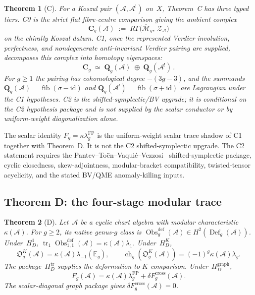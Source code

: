\documentclass[11pt,reqno]{amsart}
\newtheorem{theorem}{Theorem}[section]
\theoremstyle{definition}
\theoremstyle{remark}
\newcommand{\cA}{\mathcal{A}}
\newcommand{\cM}{\mathcal{M}}
\numberwithin{equation}{section}
\begin{document}
\begin{theorem}[C]\label{thm:C}
For a Koszul pair $(\cA, \cA^!)$ on~$X$, Theorem~C has three typed
tiers.  \textsc{C0} is the strict flat fibre-centre comparison giving
the ambient complex
\[
\mathbf{C}_g(\cA)
\;:=\;
R\Gamma\bigl(\overline{\cM}_g,\, \mathcal{Z}_\cA\bigr)
\]
on the chirally Koszul datum.  \textsc{C1}, once the represented
Verdier involution, perfectness, and nondegenerate anti-invariant
Verdier pairing are supplied, decomposes this complex into homotopy
eigenspaces:
\begin{equation}\label{eq:complementarity}
\mathbf{C}_g
\;\simeq\;
\mathbf{Q}_g(\cA) \;\oplus\; \mathbf{Q}_g(\cA^!)\,.
\end{equation}
For $g \ge 1$ the pairing has cohomological degree $-(3g-3)$, and
the summands $\mathbf{Q}_g(\cA)=
\operatorname{fib}(\sigma-\mathrm{id})$ and
$\mathbf{Q}_g(\cA^!)=\operatorname{fib}(\sigma + \mathrm{id})$
are Lagrangian under the C1 hypotheses.  \textsc{C2} is the
shifted-symplectic/BV upgrade; it is conditional on the C2 hypothesis
package and is not supplied by the scalar conductor or by
uniform-weight diagonalization alone.
\end{theorem}

The scalar identity $F_g=\kappa\lambda_g^{\mathrm{FP}}$ is the
uniform-weight scalar trace shadow of C1 together with Theorem~D.  It
is not the C2 shifted-symplectic upgrade.  The C2 statement requires
the Pantev--To\"en--Vaqui\'e--Vezzosi~\cite{PTVV13}
shifted-symplectic package, cyclic closedness, skew-adjointness,
modular-bracket compatibility, twisted-tensor acyclicity, and the
stated BV/QME anomaly-killing inputs.

\subsection{Theorem D: the four-stage modular trace}
\label{ssec:thm-d}

\begin{theorem}[D]\label{thm:D}
Let~$\cA$ be a cyclic chart algebra with modular characteristic
$\kappa(\cA)$.  For $g\geq2$, its native genus-$g$ class is
$\operatorname{Obs}^{\mathrm{def}}_g(\cA)\in
H^2(\operatorname{Def}_g(\cA))$.  Under~$H_D^1$,
$\operatorname{tr}_1\operatorname{Obs}^{\mathrm{def}}_{1,1}(\cA)
=\kappa(\cA)\lambda_1$.  Under~$H_D^K$,
\[
 \mathfrak O_g^K(\cA)=\kappa(\cA)\lambda_{-1}(\mathbb E_g),
 \qquad
 \operatorname{ch}_g(\mathfrak O_g^K(\cA))
 =(-1)^g\kappa(\cA)\lambda_g.
\]
The package~$H_D^{\mathrm{tr}}$ supplies the deformation-to-$K$
comparison.  Under~$H_D^{\mathrm{graph}}$,
\[
 F_g(\cA)=\kappa(\cA)\lambda_g^{\mathrm{FP}}
 +\delta F_g^{\mathrm{cross}}(\cA).
\]
The scalar-diagonal graph package gives
$\delta F_g^{\mathrm{cross}}(\cA)=0$.
\end{theorem}
\end{document}
